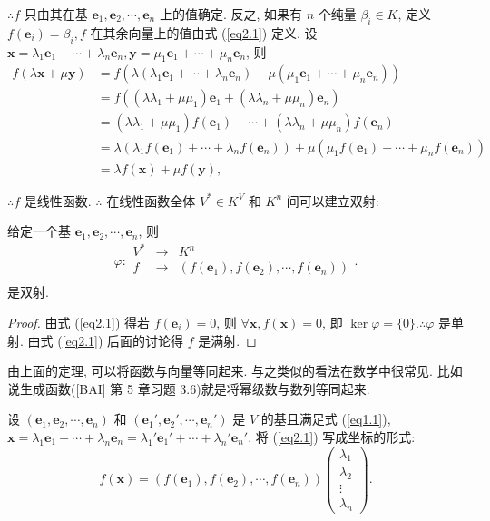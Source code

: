 \documentclass[color=black,device=normal,lang=cn,mode=geye]{elegantnote}
\begin{document}
$\therefore f$ 只由其在基 $\boldsymbol{e}_1,\boldsymbol{e}_2,\cdots,\boldsymbol{e}_n$ 上的值确定. 反之, 如果有 $n$ 个纯量 $\beta_i\in K$, 定义 $f(\boldsymbol{e}_i)=\beta_i,f$ 在其余向量上的值由式 (\ref{eq2.1}) 定义. 设 $\boldsymbol{x}=\lambda_1\boldsymbol{e}_1+\cdots+\lambda_n\boldsymbol{e}_n,\boldsymbol{y}=\mu_1\boldsymbol{e}_1+\cdots+\mu_n\boldsymbol{e}_n$, 则
\begin{align*}
    f(\lambda\boldsymbol{x}+\mu\boldsymbol{y}) & =f(\lambda(\lambda_1\boldsymbol{e}_1+\cdots+\lambda_n\boldsymbol{e}_n)+\mu(\mu_1\boldsymbol{e}_1+\cdots+\mu_n\boldsymbol{e}_n)) \\
    & =f((\lambda\lambda_1+\mu\mu_1)\boldsymbol{e}_1+(\lambda\lambda_n+\mu\mu_n)\boldsymbol{e}_n) \\
    & =(\lambda\lambda_1+\mu\mu_1)f(\boldsymbol{e}_1)+\cdots+(\lambda\lambda_n+\mu\mu_n)f(\boldsymbol{e}_n) \\
    & =\lambda(\lambda_1f(\boldsymbol{e}_1)+\cdots+\lambda_nf(\boldsymbol{e}_n))+\mu(\mu_1f(\boldsymbol{e}_1)+\cdots+\mu_nf(\boldsymbol{e}_n)) \\
    & =\lambda f(\boldsymbol{x})+\mu f(\boldsymbol{y}),
\end{align*}

$\therefore f$ 是线性函数. $\therefore$ 在线性函数全体 $V^*\in K^V$ 和 $K^n$ 间可以建立双射:
\begin{theorem}\label{t2.1}
    给定一个基 $\boldsymbol{e}_1,\boldsymbol{e}_2,\cdots,\boldsymbol{e}_n$, 则
    \[\varphi:\begin{array}{rcl}
        V^* & \to & K^n \\
        f & \to & (f(\boldsymbol{e}_1),f(\boldsymbol{e}_2),\cdots,f(\boldsymbol{e}_n)) \\
    \end{array}.\]
    是双射.
\end{theorem}
\begin{proof}
    由式 (\ref{eq2.1}) 得若 $f(\boldsymbol{e}_i)=0$, 则 $\forall\boldsymbol{x},f(\boldsymbol{x})=0$, 即 $\ker\varphi=\{0\}.\therefore\varphi$ 是单射. 由式 (\ref{eq2.1}) 后面的讨论得 $f$ 是满射. 
\end{proof}

由上面的定理, 可以将函数与向量等同起来. 与之类似的看法在数学中很常见. 比如说生成函数([BAI] 第 5 章习题 3.6)就是将幂级数与数列等同起来.

设 $(\boldsymbol{e}_1,\boldsymbol{e}_2,\cdots,\boldsymbol{e}_n)$ 和 $(\boldsymbol{e}_1',\boldsymbol{e}_2',\cdots,\boldsymbol{e}_n')$ 是 $V$ 的基且满足式 (\ref{eq1.1}), $\boldsymbol{x}=\lambda_1\boldsymbol{e}_1 +\cdots+\lambda_n\boldsymbol{e}_n=\lambda_1'\boldsymbol{e}_1'+\cdots+\lambda_n'\boldsymbol{e}_n'$. 将 (\ref{eq2.1}) 写成坐标的形式:
\[f(\boldsymbol{x})=(f(\boldsymbol{e}_1),f(\boldsymbol{e}_2),\cdots,f(\boldsymbol{e}_n))\begin{pmatrix}
    \lambda_1 \\
    \lambda_2 \\
    \vdots \\
    \lambda_n
\end{pmatrix}.\]
\end{document}
